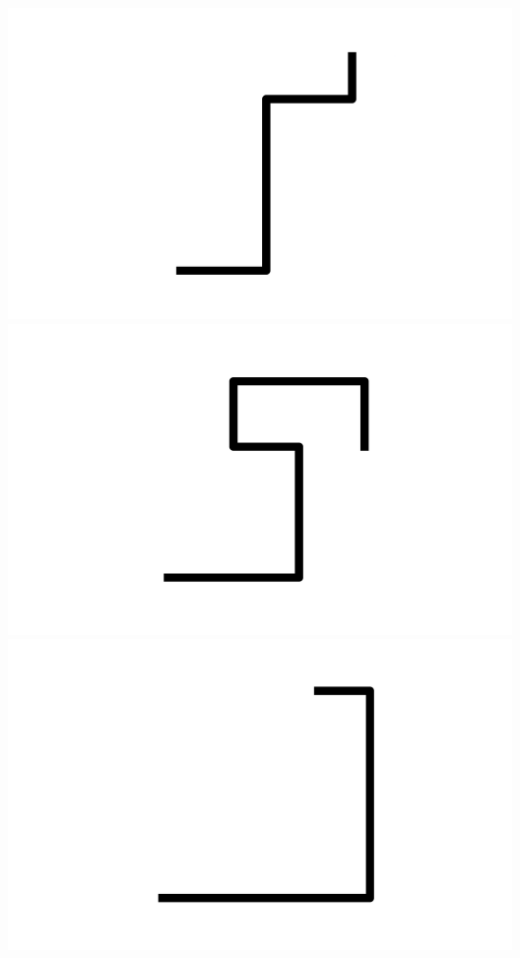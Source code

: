 \documentclass[]{report}
\begin{document}
\includegraphics[scale=.1]{pictures/21/state_cluster_shapes_76.pdf} 
\includegraphics[scale=.1]{pictures/21/state_cluster_shapes_77.pdf} 
\includegraphics[scale=.1]{pictures/21/state_cluster_shapes_78.pdf} 
\end{document}
